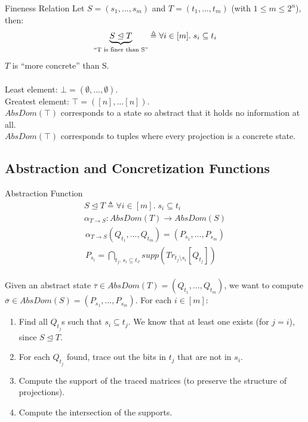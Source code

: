 \documentclass[11pt,svgnames,smaller,aspectratio=43,english]{beamer}
\makeatletter
\newcommand{\bunder}[2]{\underbrace{#1}_{\text{\scriptsize\tabular[t]{@{}c@{}}#2\endtabular}}}
\makeatother
\begin{document}
\begin{frame}{Fineness Relation} %
	Let $S = (s_1, ..., s_m)$ and $T = (t_1, ..., t_m)$ (with $1 \leq m \leq 2^n$), then:
	\begin{equation*}
		\bunder{S \trianglelefteq T}{``T is finer than S''} \triangleq \forall i \in [m].\; s_i \subseteq t_i
	\end{equation*}
	$T$ is ``more concrete'' than S.\\\;\\
	Least element: $\bot = (\emptyset, ..., \emptyset)$.\\
	Greatest element: $\top = ([n], ... [n])$.\\
	$\mathit{AbsDom}(\top)$ corresponds to a state so abstract that it holds no information at all.\\ %
	$\mathit{AbsDom}(\top)$ corresponds to tuples where every projection is a concrete state.
\end{frame}

\subsection{Abstraction and Concretization Functions}
\begin{frame}{Abstraction Function}
	\vspace*{-2em}
	\begin{gather*}
		S \trianglelefteq T \triangleq \forall i \in [m].\; s_i \subseteq t_i\\
		\alpha_{T \rightarrow S}: \mathit{AbsDom}(T) \rightarrow \mathit{AbsDom}(S)
	\end{gather*}
	\vspace*{-2em}
	\begin{gather*}
		\alpha_{T \rightarrow S}(Q_{t_1}, ..., Q_{t_{m}}) = (P_{s_1}, ..., P_{s_m})\\
		P_{s_i} = \bigcap_{t_j.\; s_i \subseteq t_J} supp(Tr_{t_j \setminus s_i} [Q_{t_j}])
	\end{gather*}
	\\\vspace*{1em}
	Given an abstract state $\overline{\tau} \in \mathit{AbsDom}(T) = (Q_{t_1}, ..., Q_{t_m})$, we want to compute $\overline{\sigma} \in \mathit{AbsDom}(S) = (P_{s_1}, ..., P_{s_m})$. For each $i\in [m]$:
	\begin{enumerate}
		\item Find all $Q_{t_j}$s such that $s_i \subseteq t_j$. We know that at least one exists (for $j=i$), since $S \trianglelefteq T$.
		\item For each $Q_{t_j}$ found, trace out the bits in $t_j$ that are not in $s_i$.
		\item Compute the support of the traced matrices (to preserve the structure of projections).
		\item Compute the intersection of the supports.
	\end{enumerate}
\end{frame}
\end{document}
